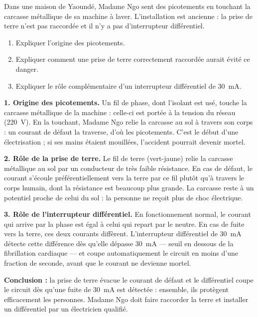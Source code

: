 \documentclass[11pt]{article}
\begin{document}
\begin{exoresolu}
Dans une maison de Yaoundé, Madame Ngo sent des picotements en touchant la carcasse métallique de sa machine à laver. L'installation est ancienne : la prise de terre n'est pas raccordée et il n'y a pas d'interrupteur différentiel.
\begin{enumerate}
\item Expliquer l'origine des picotements.
\item Expliquer comment une prise de terre correctement raccordée aurait évité ce danger.
\item Expliquer le rôle complémentaire d'un interrupteur différentiel de \SI{30}{mA}.
\end{enumerate}
\tcblower
\textbf{1. Origine des picotements.} Un fil de phase, dont l'isolant est usé, touche la carcasse métallique de la machine : celle-ci est portée à la tension du réseau (\SI{220}{V}). En la touchant, Madame Ngo relie la carcasse au sol à travers son corps : un courant de défaut la traverse, d'où les picotements. C'est le début d'une électrisation ; si ses mains étaient mouillées, l'accident pourrait devenir mortel.

\textbf{2. Rôle de la prise de terre.} Le fil de terre (vert-jaune) relie la carcasse métallique au sol par un conducteur de très faible résistance. En cas de défaut, le courant s'écoule préférentiellement vers la terre par ce fil plutôt qu'à travers le corps humain, dont la résistance est beaucoup plus grande. La carcasse reste à un potentiel proche de celui du sol : la personne ne reçoit plus de choc électrique.

\textbf{3. Rôle de l'interrupteur différentiel.} En fonctionnement normal, le courant qui arrive par la phase est égal à celui qui repart par le neutre. En cas de fuite vers la terre, ces deux courants diffèrent. L'interrupteur différentiel de \SI{30}{mA} détecte cette différence dès qu'elle dépasse \SI{30}{mA} — seuil en dessous de la fibrillation cardiaque — et coupe automatiquement le circuit en moins d'une fraction de seconde, avant que le courant ne devienne mortel.

\textbf{Conclusion :} la prise de terre évacue le courant de défaut et le différentiel coupe le circuit dès qu'une fuite de \SI{30}{mA} est détectée : ensemble, ils protègent efficacement les personnes. Madame Ngo doit faire raccorder la terre et installer un différentiel par un électricien qualifié.
\end{exoresolu}
\end{document}

